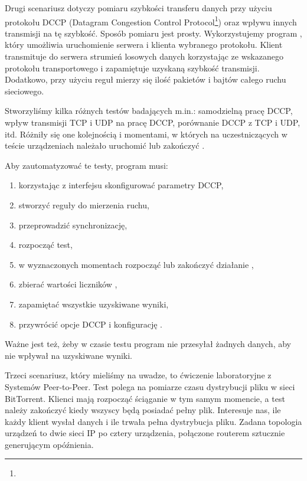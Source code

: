 \documentclass[00-praca-magisterska.tex]{subfiles}
\begin{document}
Drugi scenariusz dotyczy pomiaru szybkości transferu danych przy użyciu
protokołu DCCP (Datagram Congestion Control Protocol\footnote{}) oraz wpływu innych
transmisji na tę szybkość. Sposób pomiaru jest prosty. Wykorzystujemy program
, który umożliwia uruchomienie serwera i klienta wybranego
protokołu. Klient transmituje do serwera strumień losowych danych korzystając
ze wskazanego protokołu transportowego i zapamiętuje uzyskaną szybkość
transmisji. Dodatkowo, przy użyciu reguł  mierzy się ilość
pakietów i bajtów całego ruchu sieciowego.

Stworzyliśmy kilka różnych testów badających m.in.: samodzielną pracę DCCP,
wpływ transmisji TCP i UDP na pracę DCCP, porównanie DCCP z TCP i UDP, itd.
Różniły się one kolejnością i momentami, w których na uczestniczących w teście
urządzeniach należało uruchomić lub zakończyć .

Aby zautomatyzować te testy, program musi:
\begin{enumerate}
\item korzystając z interfejsu  skonfigurować parametry DCCP,
\item stworzyć reguły  do mierzenia ruchu,
\item przeprowadzić synchronizację, 
\item rozpocząć test,
\item w wyznaczonych momentach rozpocząć lub zakończyć działanie ,
\item zbierać wartości liczników ,
\item zapamiętać wszystkie uzyskiwane wyniki,
\item przywrócić opcje DCCP i konfigurację .
\end{enumerate}

Ważne jest też, żeby w czasie testu program nie przesyłał żadnych danych, aby
nie wpływał na uzyskiwane wyniki.

Trzeci scenariusz, który mieliśmy na uwadze, to ćwiczenie laboratoryjne z
Systemów Peer-to-Peer. Test polega na pomiarze czasu dystrybucji pliku w sieci
BitTorrent. Klienci mają rozpocząć ściąganie w tym samym momencie, a test należy
zakończyć kiedy wszyscy będą posiadać pełny plik. Interesuje nas, ile każdy
klient wysłał danych i ile trwała pełna dystrybucja pliku. Zadana topologia
urządzeń to dwie sieci IP po cztery urządzenia, połączone routerem sztucznie
generującym opóźnienia.
\end{document}
